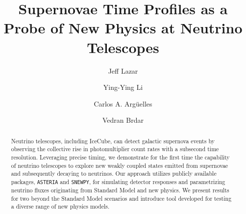 \documentclass[aps,twocolumn,prl,showpacs,showkeys,preprintnumbers,superscriptaddress,nobibnotes,floatfix,longbibliography,notitlepage,nofootinbib]{revtex4-2}
\begin{document}

\title{
Supernovae Time Profiles as a Probe of New Physics at Neutrino Telescopes
}

\author{Jeff Lazar}
\author{Ying-Ying Li}
\author{Carlos A. Arg\"{u}elles}
\author{Vedran Brdar}


\begin{abstract}
Neutrino telescopes, including IceCube, can detect galactic supernova events by observing the collective rise in photomultiplier count rates with a subsecond time resolution. 
Leveraging precise timing, we demonstrate for the first time the capability of neutrino telescopes to explore new weakly coupled states emitted from supernovae and subsequently decaying to neutrinos.
Our approach utilizes publicly available packages, \texttt{ASTERIA} and \texttt{SNEWPY}, for simulating detector responses and parametrizing neutrino fluxes originating from Standard Model and new physics. 
We present results for two beyond the Standard Model scenarios and introduce tool developed for testing a diverse range of new physics models.
\end{abstract}

\maketitle
\end{document}

